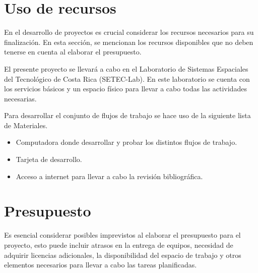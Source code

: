 \documentclass[12pt]{article}
\begin{document}
  \newpage
\section{Uso de recursos}

En el desarrollo de proyectos es crucial considerar los recursos necesarios para su finalización. En esta sección, se mencionan los recursos disponibles que no deben tenerse en cuenta al elaborar el presupuesto. 

El presente proyecto se llevará a cabo en el Laboratorio de Sistemas Espaciales del Tecnológico de Costa Rica (SETEC-Lab). En este laboratorio se cuenta con los servicios básicos y un espacio físico para llevar a cabo todas las actividades necesarias. 


Para desarrollar el conjunto de flujos de trabajo se hace uso de la siguiente lista de Materiales.

\begin{itemize}
  \item Computadora donde desarrollar y probar los distintos flujos de trabajo.
  \item Tarjeta de desarrollo.
  \item Acceso a internet para llevar a cabo la revisión bibliográfica.
\end{itemize}


\section{Presupuesto}

Es esencial considerar posibles imprevistos al elaborar el presupuesto para el proyecto, esto puede incluir atrasos en la entrega de equipos, necesidad de adquirir licencias adicionales, la disponibilidad del espacio de trabajo y otros elementos necesarios para llevar a cabo las tareas planificadas. 
\end{document}
